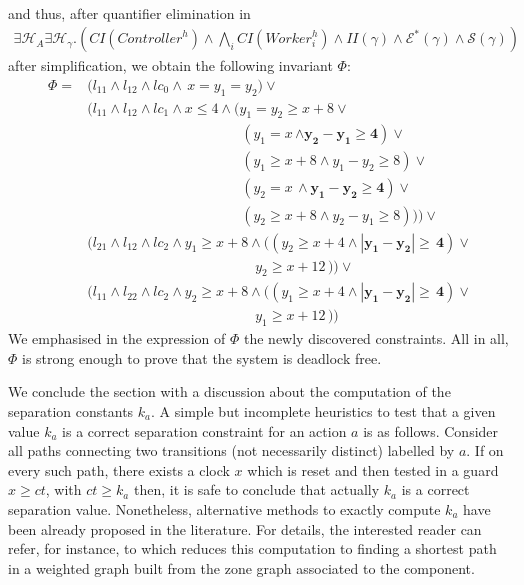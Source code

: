 \documentclass{LMCS}
\newcommand{\hp}{\mathcal{H}_A}
\newcommand{\hist}{\mathcal{H}}
\newcommand{\eqsc}{\mathcal{E}^*}
\newcommand{\ctn}{\mathit{Controller}}
\newcommand{\cwk}{\mathit{Worker}}
\newcommand{\ic}{\mathit{CI}}
\newcommand{\iim}{\mathit{II}}
\newcommand{\sep}{\mathcal{S}}
\theoremstyle{plain}\newtheorem{remark}[thm]{Remark}
\theoremstyle{plain}\newtheorem{example}[thm]{Example}
\begin{document}
\begin{exa}
\begin{align*}
\end{align*}
and thus, after quantifier elimination in 
\begin{align*}
\exists \hp \exists \hist_{\gamma}.(\ic(\ctn^{h}) \wedge \bigwedge_i \ic(\cwk_i^{h}) \wedge \iim(\gamma) \wedge \eqsc(\gamma) \wedge \sep(\gamma))
\end{align*}
after simplification, we obtain the following invariant $\Phi$:
\begin{align*}
\Phi = 
& \big(l_{11}\wedge l_{12}\wedge lc_{0} \wedge\, {x=y_1=y_2}\big) \vee \\
& \big(l_{11}\wedge l_{12}\wedge lc_{1} \wedge {x \leq 4 \wedge( y_1=y_2 \geq x+8 \vee\, }  \\
& \qquad \qquad \qquad \qquad \qquad \quad {(y_1=x\, \bm{\wedge y_2-y_1 \geq 4}) } \vee \\
& \qquad \qquad \qquad \qquad \qquad \quad {(y_1 \geq x+8 \wedge y_1-y_2 \geq 8)} \vee\\
& \qquad \qquad \qquad \qquad \qquad \quad {(y_2=x\, \wedge \bm{y_1-y_2 \geq 4})} \vee\\
& \qquad \qquad \qquad \qquad \qquad \quad {(y_2 \geq x+8 \wedge y_2-y_1 \geq 8)  }) \big) \vee\\
& \big(l_{21}\wedge l_{12}\wedge lc_{2} \wedge {y_1\geq x+8 \wedge ( (y_2 \geq x+4 \wedge \bm{|y_1-y_2| \geq \,4 } )}\vee\\
& \qquad \qquad \qquad \qquad  \qquad  \qquad         {  y_2 \geq x+12 \, }) \big) \vee\\
& \big(l_{11}\wedge l_{22}\wedge lc_{2} \wedge {y_2\geq x+8 \wedge ( (y_1 \geq x+4 \wedge \bm{|y_1-y_2| \geq \,4 } )}\vee\\
& \qquad \qquad \qquad \qquad  \qquad  \qquad         {  y_1 \geq x+12 \, }) \big)
\end{align*}
We emphasised in the expression of $\Phi$ the newly discovered
constraints. All in all, $\Phi$ is strong enough to prove that the
system is deadlock free.
\end{exa}

We conclude the section with a discussion about the computation of the
separation constants $k_a$.  A simple but incomplete heuristics to
test that a given value $k_a$ is a correct separation constraint for
an action $a$ is as follows.  Consider all paths connecting two
transitions (not necessarily distinct) labelled by $a$.  If on every
such path, there exists a clock $x$ which is reset and then tested in
a guard $x \ge ct$, with $ct \ge k_a$ then, it is safe to conclude
that actually $k_a$ is a correct separation value.  Nonetheless,
alternative methods to exactly compute $k_a$ have been already
proposed in the literature.  For details, the interested reader can
refer, for instance, to \cite{courcoubetis92} which reduces this
computation to finding a shortest path in a weighted graph built from
the zone graph associated to the component.
\end{document}
